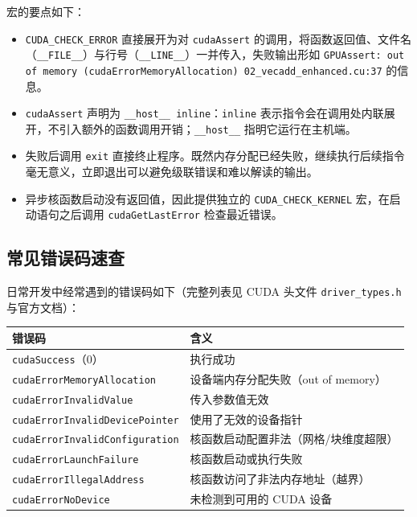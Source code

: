 宏的要点如下：

\begin{itemize}
    \item \texttt{CUDA\_CHECK\_ERROR} 直接展开为对 \texttt{cudaAssert} 的调用，将函数返回值、文件名（\texttt{\_\_FILE\_\_}）与行号（\texttt{\_\_LINE\_\_}）一并传入，失败输出形如 \texttt{GPUAssert: out of memory (cudaErrorMemoryAllocation) 02\_vecadd\_enhanced.cu:37} 的信息。
    \item \texttt{cudaAssert} 声明为 \texttt{\_\_host\_\_ inline}：\texttt{inline} 表示指令会在调用处内联展开，不引入额外的函数调用开销；\texttt{\_\_host\_\_} 指明它运行在主机端。
    \item 失败后调用 \texttt{exit} 直接终止程序。既然内存分配已经失败，继续执行后续指令毫无意义，立即退出可以避免级联错误和难以解读的输出。
    \item 异步核函数启动没有返回值，因此提供独立的 \texttt{CUDA\_CHECK\_KERNEL} 宏，在启动语句之后调用 \texttt{cudaGetLastError} 检查最近错误。
\end{itemize}

\subsection{常见错误码速查}

日常开发中经常遇到的错误码如下（完整列表见 CUDA 头文件 \texttt{driver\_types.h} 与官方文档）：

\begin{center}
\begin{tabular}{|p{5.4cm}|p{7cm}|}
\hline
\textbf{错误码} & \textbf{含义} \\
\hline
\texttt{cudaSuccess}（0） & 执行成功 \\
\hline
\texttt{cudaErrorMemoryAllocation} & 设备端内存分配失败（out of memory） \\
\hline
\texttt{cudaErrorInvalidValue} & 传入参数值无效 \\
\hline
\texttt{cudaErrorInvalidDevicePointer} & 使用了无效的设备指针 \\
\hline
\texttt{cudaErrorInvalidConfiguration} & 核函数启动配置非法（网格/块维度超限） \\
\hline
\texttt{cudaErrorLaunchFailure} & 核函数启动或执行失败 \\
\hline
\texttt{cudaErrorIllegalAddress} & 核函数访问了非法内存地址（越界） \\
\hline
\texttt{cudaErrorNoDevice} & 未检测到可用的 CUDA 设备 \\
\hline
\end{tabular}
\end{center}

